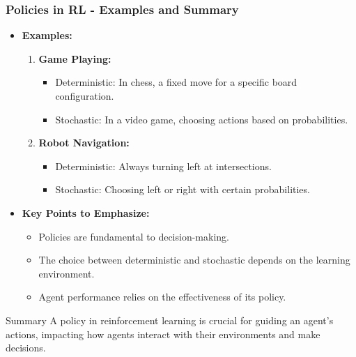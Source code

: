 \documentclass{beamer}
\begin{document}
\begin{frame}[fragile]
    \frametitle{Policies in RL - Examples and Summary}
    \begin{itemize}
        \item \textbf{Examples:}
        \begin{enumerate}
            \item \textbf{Game Playing:}
            \begin{itemize}
                \item Deterministic: In chess, a fixed move for a specific board configuration.
                \item Stochastic: In a video game, choosing actions based on probabilities.
            \end{itemize}
            \item \textbf{Robot Navigation:}
            \begin{itemize}
                \item Deterministic: Always turning left at intersections.
                \item Stochastic: Choosing left or right with certain probabilities.
            \end{itemize}
        \end{enumerate}
        
        \item \textbf{Key Points to Emphasize:}
        \begin{itemize}
            \item Policies are fundamental to decision-making.
            \item The choice between deterministic and stochastic depends on the learning environment.
            \item Agent performance relies on the effectiveness of its policy.
        \end{itemize}
    \end{itemize}
    
    \begin{block}{Summary}
        A policy in reinforcement learning is crucial for guiding an agent's actions, impacting how agents interact with their environments and make decisions.
    \end{block}
\end{frame}
\end{document}
